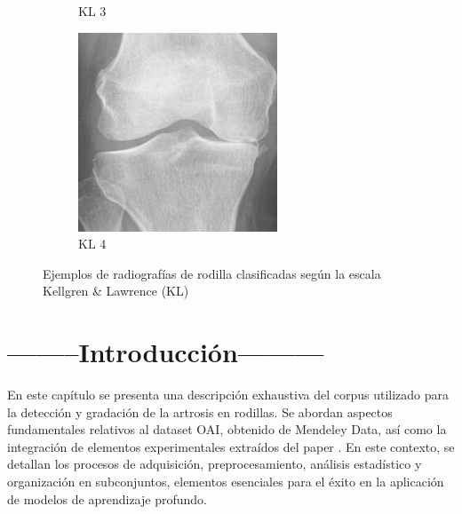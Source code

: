 \documentclass[11pt,spanish,listoffigures,listoftables]{tfgetsinf}
\begin{document}
\begin{figure}[htbp]
\begin{subfigure}[b]{0.19\textwidth}
        \caption{KL 3}
        \label{fig:knee3}
    \end{subfigure}
    \hfill
    \begin{subfigure}[b]{0.19\textwidth}
        \includegraphics[width=\textwidth]{knee_4.png}
        \caption{KL 4}
        \label{fig:knee4}
    \end{subfigure}
    \caption{Ejemplos de radiografías de rodilla clasificadas según la escala Kellgren \& Lawrence (KL)}
    \label{fig:knee-examples}
\end{figure}



\section{--------Introducción---------}
En este capítulo se presenta una descripción exhaustiva del corpus utilizado para la detección y gradación de la artrosis en rodillas. Se abordan aspectos fundamentales relativos al dataset OAI, obtenido de Mendeley Data, así como la integración de elementos experimentales extraídos del paper \cite{efficientnet_paper}. En este contexto, se detallan los procesos de adquisición, preprocesamiento, análisis estadístico y organización en subconjuntos, elementos esenciales para el éxito en la aplicación de modelos de aprendizaje profundo.
\end{document}
